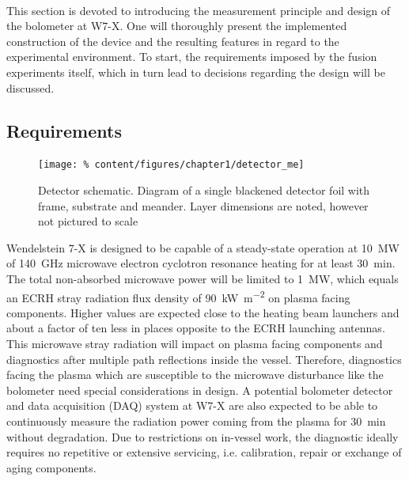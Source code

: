         \,\\%
%
        This section is devoted to introducing the measurement principle and design of the bolometer at W7-X. One will thoroughly present the implemented construction of the device and the resulting features in regard to the experimental environment. To start, the requirements imposed by the fusion experiments itself, which in turn lead to decisions regarding the design will be discussed.%
%
        \subsection{Requirements}\label{sec:requirements}%
%
            \begin{figure}[t]%
                \centering%
                \texttt{[image: \%
                    content/figures/chapter1/detector\_me]}%
                \caption{%
                    Detector schematic. Diagram of a single blackened detector foil with frame, substrate and meander. Layer dimensions are noted, however not pictured to scale}\label{fig:detector_me}%
            \end{figure}%
%
            Wendelstein 7-X is designed to be capable of a steady-state operation at \SI{10}{\mega\watt} of \SI{140}{\giga\hertz} microwave electron cyclotron resonance heating for at least \SI{30}{\minute}. The total non-absorbed microwave power will be limited to \SI{1}{\mega\watt}, which equals an ECRH stray radiation flux density of \SI{90}{\kilo\watt\per\square\meter} on plasma facing components. Higher values are expected close to the heating beam launchers and about a factor of ten less in places opposite to the ECRH launching antennas\cite{Hathiramani2013}. This microwave stray radiation will impact on plasma facing components and diagnostics after multiple path reflections inside the vessel. Therefore, diagnostics facing the plasma which are susceptible to the microwave disturbance like the bolometer need special considerations in design\cite{Zhang2010}. A potential bolometer detector and data acquisition (DAQ) system at W7-X are also expected to be able to continuously measure the radiation power coming from the plasma for \SI{30}{\minute} without degradation. Due to restrictions on in-vessel work, the diagnostic ideally requires no repetitive or extensive servicing, i.e. calibration, repair or exchange of aging components.\\%
